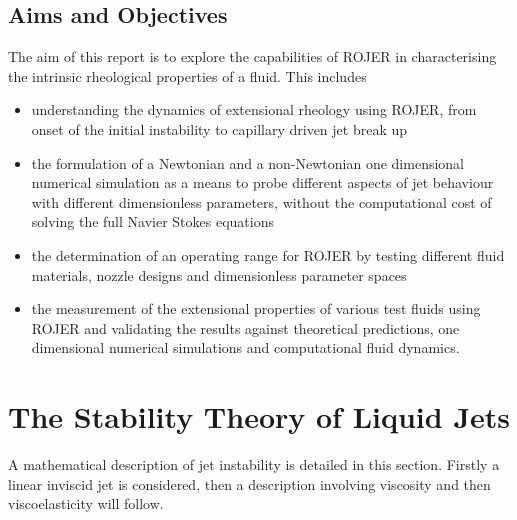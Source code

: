 \documentclass[11pt]{article}
\begin{document}
\subsection{Aims and Objectives}
The aim of this report is to explore the capabilities of ROJER in characterising the intrinsic rheological properties of a fluid. This includes
\begin{itemize}
\item understanding the dynamics of extensional rheology using ROJER, from onset of the initial instability to capillary driven jet break up
\item the formulation of a Newtonian and a non-Newtonian one dimensional numerical simulation as a means to probe different aspects of jet behaviour with different dimensionless parameters, without the computational cost of solving the full Navier Stokes equations
\item the determination of an operating range for ROJER by testing different fluid materials, nozzle designs and dimensionless parameter spaces
\item the measurement of the extensional properties of various test fluids using ROJER and validating the results against theoretical predictions, one dimensional numerical simulations and computational fluid dynamics. 
\end{itemize}

\newpage

\section{The Stability Theory of Liquid Jets} \label{sec:stability}
A mathematical description of jet instability is detailed in this section. Firstly a linear inviscid jet is considered, then a description involving viscosity and then viscoelasticity will follow.
\end{document}
